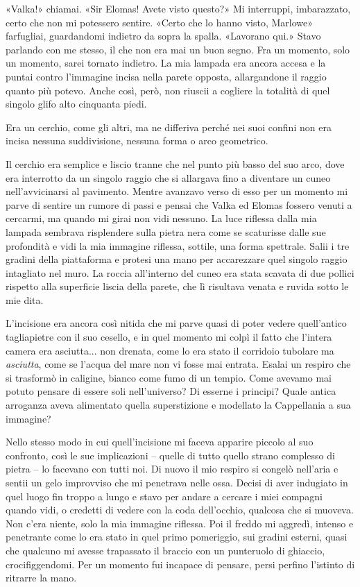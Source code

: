 «Valka!» chiamai. «Sir Elomas! Avete visto questo?» Mi {interruppi},
imbarazzato, certo che non mi potessero sentire. «Certo che lo hanno
visto, Marlowe» farfugliai, guardandomi indietro da sopra la spalla.
«Lavorano qui.» Stavo parlando con me stesso, il che non era mai un buon
segno. Fra un momento, solo un momento, sarei tornato indietro. La mia
lampada era ancora accesa e la puntai contro l'immagine incisa nella
parete opposta, allargandone il raggio quanto più potevo. Anche così,
però, non riuscii a cogliere la totalità di quel singolo glifo alto
cinquanta piedi.

Era un cerchio, come gli altri, ma ne differiva perché nei suoi confini
non era incisa nessuna suddivisione, nessuna forma o arco geometrico.

Il cerchio era semplice e liscio tranne che nel punto più basso del suo
arco, dove era interrotto da un singolo raggio che si allargava fino a
diventare un cuneo nell'avvicinarsi al pavimento. Mentre avanzavo verso
di esso per un momento mi parve di sentire un rumore di passi e pensai
che Valka ed Elomas fossero venuti a cercarmi, ma quando mi girai non
vidi nessuno. La luce riflessa dalla mia lampada sembrava risplendere
sulla pietra nera come se scaturisse dalle sue profondità e vidi la mia
immagine riflessa, sottile, una forma spettrale. Salii i tre gradini
della piattaforma e protesi una mano per accarezzare quel singolo raggio
intagliato nel muro. La roccia all'interno del cuneo era stata scavata
di due pollici rispetto alla superficie liscia della parete, che lì
risultava venata e ruvida sotto le mie dita.

L'incisione era ancora così nitida che mi parve quasi di poter vedere
quell'antico tagliapietre con il suo cesello, e in quel momento mi colpì
il fatto che l'intera camera era asciutta... non drenata, come lo era
stato il corridoio tubolare ma \emph{asciutta}, come se l'acqua del mare
non vi fosse mai entrata. Esalai un respiro che si trasformò in
caligine, bianco come fumo di un tempio. Come avevamo mai potuto pensare
di essere soli nell'universo? Di esserne i principi? Quale antica
arroganza aveva alimentato quella superstizione e modellato la
Cappellania a sua immagine?

Nello stesso modo in cui quell'incisione mi faceva apparire piccolo al
suo confronto, così le sue implicazioni -- quelle di tutto quello strano
complesso di pietra -- lo facevano con tutti noi. Di nuovo il mio
respiro si congelò nell'aria e sentii un gelo improvviso che mi
penetrava nelle ossa. Decisi di aver indugiato in quel luogo fin troppo
a lungo e stavo per andare a cercare i miei compagni quando vidi, o
credetti di vedere con la coda dell'occhio, qualcosa che si muoveva. Non
c'era niente, solo la mia immagine riflessa. Poi il freddo mi aggredì,
intenso e penetrante come lo era stato in quel primo pomeriggio, sui
gradini esterni, quasi che qualcuno mi avesse trapassato il braccio con
un punteruolo di ghiaccio, crocifiggendomi. Per un momento fui incapace
di pensare, persi perfino l'istinto di ritrarre la mano.

